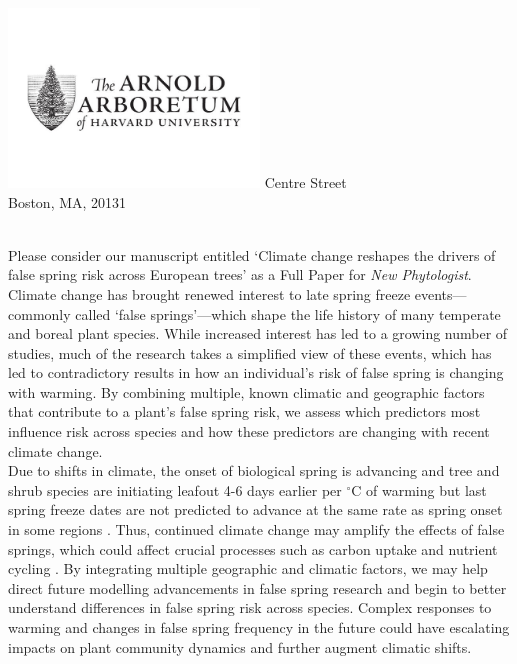 \documentclass[11pt,a4paper]{article}\usepackage[]{graphicx}\usepackage[]{color}
\begin{document}
\includegraphics[width=0.5\textwidth, right]{AA_logo.jpg}
 Centre Street\\
\noindent Boston, MA, 20131\\


\vspace{1.5ex}




\vspace{3ex}\\
\noindent Please consider our manuscript entitled `Climate change reshapes the drivers of false spring risk across European trees' as a Full Paper for \textit{New Phytologist}. Climate change has brought renewed interest to late spring freeze events---commonly called `false springs'---which shape the life history of many temperate and boreal plant species. While increased interest has led to a growing number of studies, much of the research takes a simplified view of these events, which has led to contradictory results in how an individual's risk of false spring is changing with warming. By combining multiple, known climatic and geographic factors that contribute to a plant's false spring risk, we assess which predictors most influence risk across species and how these predictors are changing with recent climate change.  \\

\noindent Due to shifts in climate, the onset of biological spring is advancing and tree and shrub species are initiating leafout 4-6 days earlier per $^{\circ}$C of warming \citep{Wolkovich2012, Polgar2014, Fu2015} but last spring freeze dates are not predicted to advance at the same rate as spring onset in some regions \citep{Inouye2008,Martin2010,Labe2016,Wypych2016a,Sgubin2018}. Thus, continued climate change may amplify the effects of false springs, which could affect crucial processes such as carbon uptake and nutrient cycling \citep{Hufkens2012,Richardson2013,Klosterman2018}. By integrating multiple geographic and climatic factors, we may help direct future modelling advancements in false spring research and begin to better understand differences in false spring risk across species. Complex responses to warming and changes in false spring frequency in the future could have escalating impacts on plant community dynamics and further augment climatic shifts. \\
\end{document}
